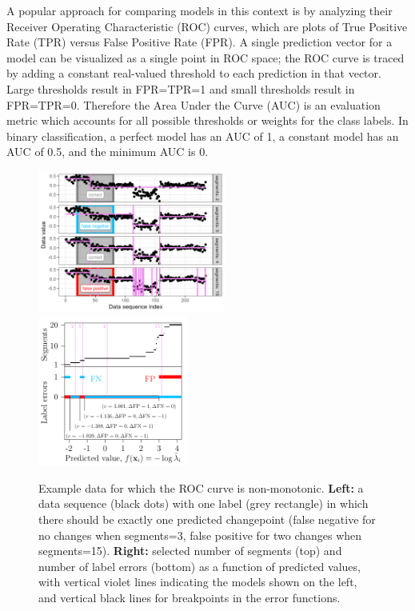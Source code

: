 \documentclass{article}
\begin{document}
A popular approach for comparing models in this context is by analyzing their Receiver Operating Characteristic (ROC) curves, which are plots of True Positive Rate (TPR) versus False Positive Rate (FPR).
A single prediction vector for a model can be visualized as a single point in ROC space; the ROC curve is traced by adding a constant real-valued threshold to each prediction in that vector.
Large thresholds result in FPR=TPR=1 and small thresholds result in FPR=TPR=0.
Therefore the Area Under the Curve (AUC) is an evaluation metric which accounts for all possible thresholds or weights for the class labels.
In binary classification, a perfect model has an AUC of 1, a constant model has an AUC of 0.5, and the minimum AUC is 0.


\begin{figure}[ht]
\vskip 0.2in
\begin{center}
\includegraphics[width=0.55\textwidth]{figure-fn-not-monotonic.png}
\includegraphics[width=0.44\textwidth]{figure-fn-not-monotonic-error-standAlone.pdf}
\vskip -0.5cm
\caption{Example data for which the ROC curve is non-monotonic. 
\textbf{Left:} a data sequence (black dots) with one label (grey rectangle) in which there should be exactly one predicted changepoint (false negative for no changes when segments=3, false positive for two changes when segments=15).  
\textbf{Right:} selected number of segments (top) and number of label errors (bottom) as a function of predicted values, with vertical violet lines indicating the models shown on the left, and vertical black lines for breakpoints in the error functions. 
}
\label{fig:fn-not-monotonic}
\end{center}
\vskip -0.2in
\end{figure}
\end{document}
